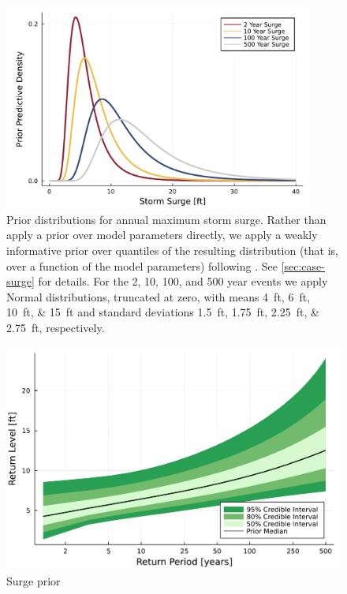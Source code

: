 \documentclass[11pt]{article}
\begin{document}
\begin{figure}
    \centering
    \includegraphics[width=4in]{surge-gev-priors}
    \caption{
        Prior distributions for annual maximum storm surge.
        Rather than apply a prior over model parameters directly, we apply a weakly informative prior over quantiles of the resulting distribution (that is, over a function of the model parameters) following \citet{coles_evd:1996}.
        See \cref{sec:case-surge} for details.
        For the 2, 10, 100, and 500 year events we apply Normal distributions, truncated at zero, with means \SIlist{4;6;10;15}{ft} and standard deviations \SIlist{1.5;1.75;2.25;2.75}{ft}, respectively.
    }\label{fig:surge-gev-priors}
\end{figure}

\begin{figure}
    \centering
    \includegraphics[width=\textwidth]{surge-prior-return}
    \caption{
        Surge prior
    }\label{fig:surge-prior-return}
\end{figure}
\end{document}
